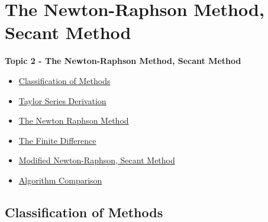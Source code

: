\documentclass[fleqn]{beamer} %
\newcommand{\sectionIItitle}{The Newton-Raphson Method, Secant Method}
\newcommand{\sectionIIsubsectionItitle}{Classification of Methods}
\newcommand{\sectionIIsubsectionIItitle}{Taylor Series Derivation}
\newcommand{\sectionIIsubsectionIIItitle}{The Newton Raphson Method}
\newcommand{\sectionIIsubsectionIVtitle}{The Finite Difference}
\newcommand{\sectionIIsubsectionVtitle}{Modified Newton-Raphson, Secant Method}
\newcommand{\sectionIIsubsectionVItitle}{Algorithm Comparison}
\begin{document}
	\section{\sectionIItitle}\label{sectionII}

		\begin{frame}
			\large \textbf{Topic 2 - \sectionIItitle} \vspace{3mm}\\

			\begin{itemize}
				\item \hyperlink{sectionIIsubsectionI}{\sectionIIsubsectionItitle} \vspc %
				\item \hyperlink{sectionIIsubsectionII}{\sectionIIsubsectionIItitle} \vspc %
				\item \hyperlink{sectionIIsubsectionIII}{\sectionIIsubsectionIIItitle} \vspc %
				\item \hyperlink{sectionIIsubsectionIV}{\sectionIIsubsectionIVtitle} \vspc %
				\item \hyperlink{sectionIIsubsectionV}{\sectionIIsubsectionVtitle} \vspc %
				\item \hyperlink{sectionIIsubsectionVI}{\sectionIIsubsectionVItitle} \vspc %
			\end{itemize}

		\end{frame}

		\subsection{\sectionIIsubsectionItitle}\label{sectionIIsubsectionI}
\end{document}
